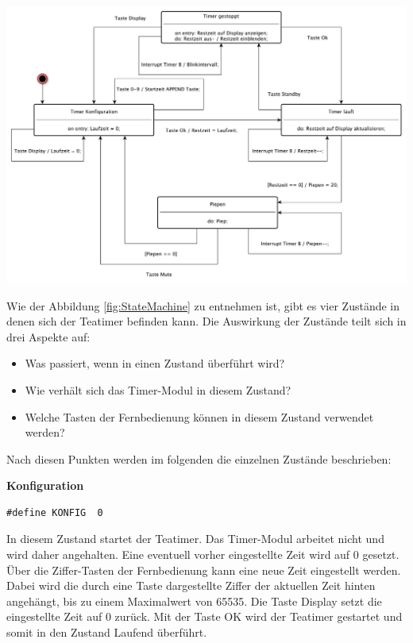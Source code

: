 \documentclass[12pt,a4paper,bibliography=totocnumbered,listof=totocnumbered]{scrartcl}
\begin{document}
\vspace{1em}
\begin{minipage}{\linewidth}
	\centering
	\includegraphics[width=1\linewidth]{img/Zustandsdiagramm.pdf}
	\label{fig:StateMachine}
\end{minipage}

Wie der Abbildung \ref{fig:StateMachine} zu entnehmen ist, gibt es vier Zustände in denen sich der Teatimer befinden kann. Die Auswirkung der Zustände teilt sich in drei Aspekte auf:
\begin{itemize}
	\item Was passiert, wenn in einen Zustand überführt wird?
	\item Wie verhält sich das Timer-Modul in diesem Zustand?
	\item Welche Tasten der Fernbedienung können in diesem Zustand verwendet werden?
\end{itemize}

Nach diesen Punkten werden im folgenden die einzelnen Zustände beschrieben:

\textbf{Konfiguration}
\begin{lstlisting}
#define KONFIG  0
\end{lstlisting}
In diesem Zustand startet der Teatimer. Das Timer-Modul arbeitet nicht und wird daher angehalten. Eine eventuell vorher eingestellte Zeit wird auf 0 gesetzt. Über die Ziffer-Tasten der Fernbedienung kann eine neue Zeit eingestellt werden. Dabei wird die durch eine Taste dargestellte Ziffer der aktuellen Zeit hinten angehängt, bis zu einem Maximalwert von 65535. Die Taste \glqq Display\grqq{} setzt die eingestellte Zeit auf 0 zurück. Mit der Taste \glqq OK\grqq{} wird der Teatimer gestartet und somit in den Zustand \glqq Laufend\grqq{} überführt.
\end{document}
